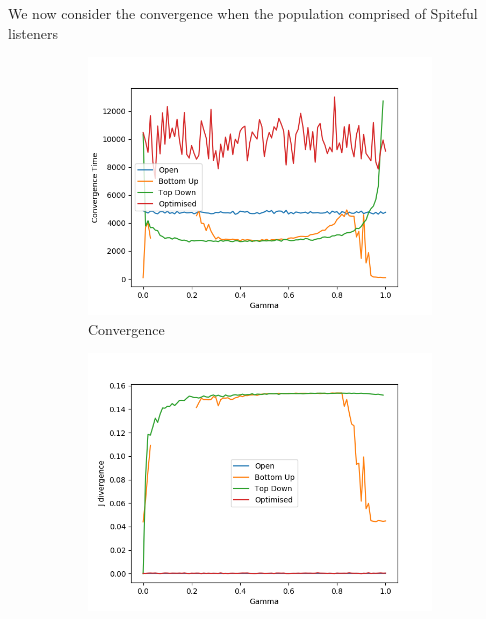 We now consider the convergence when the population comprised of Spiteful listeners



\begin{figure}[H]
 \centering
  \begin{subfigure}[ht]{0.45\textwidth}
    \includegraphics[width=\textwidth]{Images/Figures/ListenerModelPlots/Spiteful/Convergence.png}
    \caption{Convergence}
 \end{subfigure}
 \hfill
 \begin{subfigure}[ht]{0.45\textwidth}
    \includegraphics[width=\textwidth]{Images/Figures/ListenerModelPlots/Spiteful/J-Div.png}

\end{subfigure}
\end{figure}
